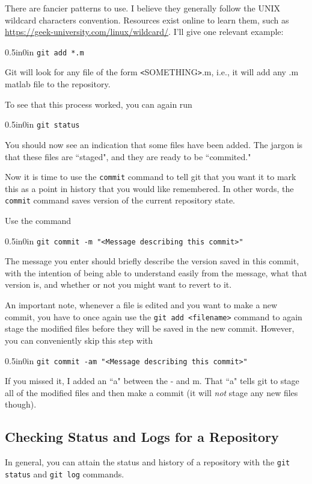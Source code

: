 \documentclass[11pt]{article}
\newcommand{\code}[1]{\begin{adjustwidth}{0.5in}{0in}
    \texttt{#1}
    \end{adjustwidth}}
\begin{document}
There are fancier patterns to use.  I believe they generally follow the UNIX wildcard characters convention.  Resources exist online to learn them, such as \url{https://geek-university.com/linux/wildcard/}.  I'll give one relevant example:

\code{git add *.m}
 
 Git will look for any file of the form \texttt{<}SOMETHING\texttt{>}.m, i.e., it will add any .m matlab file to the repository.
 
To see that this process worked, you can again run
 
\code{git status}
 
You should now see an indication that some files have been added.  The jargon is that these files are ``staged", and they are ready to be ``commited."
 
 Now it is time to use the \texttt{commit} command to tell git that you want it to mark this as a point in history that you would like remembered.  In other words, the \texttt{commit} command saves version of the current repository state.  
 
 Use the command
 
 \code{git commit -m "<Message describing this commit>"}

The message you enter should briefly describe the version saved in this commit, with the intention of being able to understand easily from the message, what that version is, and whether or not you might want to revert to it.

An important note, whenever a file is edited and you want to make a new commit, you have to once again use the \texttt{git add <filename>} command to again stage the modified files before they will be saved in the new commit.  However, you can conveniently skip this step with

\code{git commit -am "<Message describing this commit>"}
 
If you missed it, I added an ``a" between the - and m.  That ``a" tells git to stage all of the modified files and then make a commit (it will \emph{not} stage any new files though).
 
\subsection{Checking Status and Logs for a Repository}
  
In general, you can attain the status and history of a repository with the \texttt{git status} and \texttt{git log} commands.  
  
\end{document}
